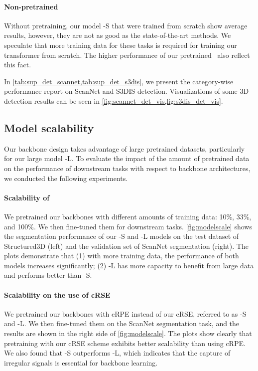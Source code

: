 \documentclass[10pt,twocolumn,letterpaper]{article}
\begin{document}
\paragraph{Non-pretrained \SST}
Without pretraining, our model \SST-S that were trained from scratch show average results, however, they are not as good as the state-of-the-art methods. We speculate that more training data for these tasks is required for training our transformer from scratch. The higher performance of our pretrained \SST ~also reflect this fact.


In \cref{tab:sup_det_scannet,tab:sup_det_s3dis}, we present the category-wise performance report on ScanNet and S3DIS detection. Visualizations of some 3D detection results can be seen in \cref{fig:scannet_det_vis,fig:s3dis_det_vis}.

\subsection{Model scalability} \label{subsec:eval_scale}
Our backbone design takes advantage of large pretrained datasets, particularly for our large model {\SST}-L. To evaluate the impact of the amount of pretrained data on the performance of downstream tasks with respect to backbone architectures, we conducted the following experiments.

\paragraph{Scalability of {\SST}} We pretrained our backbones with different amounts of training data: 10\%, 33\%, and 100\%. We then fine-tuned them for downstream tasks. \cref{fig:modelscale} shows the segmentation performance of our {\SST}-S and {\SST}-L models on the test dataset of Structured3D (left) and the validation set of ScanNet segmentation (right). The plots demonstrate that (1) with more training data, the performance of both models increases significantly; (2) {\SST}-L has more capacity to benefit from large data and performs better than {\SST}-S.

\paragraph{Scalability on the use of cRSE}
We pretrained our backbones with cRPE instead of our cRSE, referred to as {\SST}-S and {\SST}-L. We then fine-tuned them on the ScanNet segmentation task, and the results are shown in the right side of \cref{fig:modelscale}. The plots show clearly that pretraining with our cRSE scheme exhibits better scalability than using cRPE. We also found that \SST-S
outperforms {\SST}-L, which indicates that the capture of irregular signals is essential for backbone learning.
\end{document}
